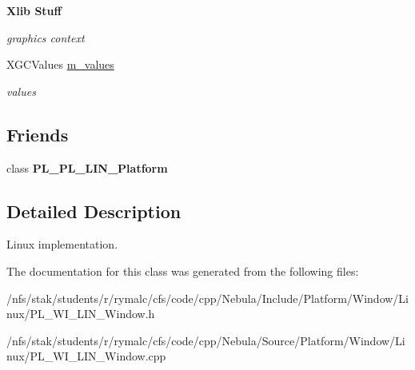\begin{Indent}{\bf Xlib Stuff}
\begin{DoxyCompactItemize}
\begin{DoxyCompactList}\small\item\em graphics context \item\end{DoxyCompactList}\item 
\hypertarget{classPlatform_1_1Window_1_1Linux_1_1Window_a238d8047059bbc72df844e6831302103}{
XGCValues \hyperlink{classPlatform_1_1Window_1_1Linux_1_1Window_a238d8047059bbc72df844e6831302103}{m\_\-values}}
\label{classPlatform_1_1Window_1_1Linux_1_1Window_a238d8047059bbc72df844e6831302103}

\begin{DoxyCompactList}\small\item\em values \item\end{DoxyCompactList}\end{DoxyCompactItemize}
\end{Indent}
\subsection*{Friends}
\begin{DoxyCompactItemize}
\item 
\hypertarget{classPlatform_1_1Window_1_1Linux_1_1Window_a0630637db6206da2e723ac98bab730a6}{
class {\bfseries PL\_\-PL\_\-LIN\_\-Platform}}
\label{classPlatform_1_1Window_1_1Linux_1_1Window_a0630637db6206da2e723ac98bab730a6}

\end{DoxyCompactItemize}


\subsection{Detailed Description}
Linux implementation. 

The documentation for this class was generated from the following files:\begin{DoxyCompactItemize}
\item 
/nfs/stak/students/r/rymalc/cfs/code/cpp/Nebula/Include/Platform/Window/Linux/PL\_\-WI\_\-LIN\_\-Window.h\item 
/nfs/stak/students/r/rymalc/cfs/code/cpp/Nebula/Source/Platform/Window/Linux/PL\_\-WI\_\-LIN\_\-Window.cpp\end{DoxyCompactItemize}
